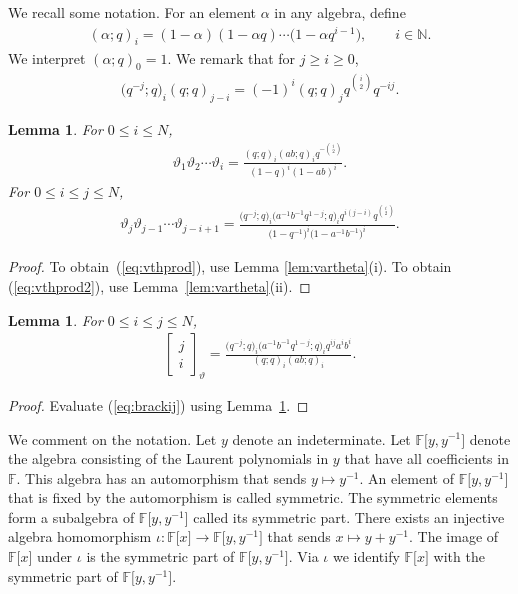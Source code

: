 \documentclass[pdftex]{sigma}
\numberwithin{equation}{section}
\newtheorem{Lemma}[Theorem]{Lemma}
\begin{document}
We recall some notation. For an element $\alpha$ in
any algebra, define
\begin{gather*}
(\alpha;q)_i = (1-\alpha) (1-\alpha q) \cdots \big(1-\alpha q^{i-1}\big),
\qquad i \in \mathbb N.
\end{gather*}
We interpret $(\alpha;q)_0=1$.
We remark that for $j\geq i\geq 0$,
\begin{gather}
\big(q^{-j};q\big)_i(q;q)_{j-i} =(-1)^i(q;q)_jq^{\binom{i}{2}}q^{-ij}.\label{eq:qint}
\end{gather}

\begin{Lemma}\label{lem:usefulvt}
For $0 \leq i \leq N$,
\begin{gather}
\vartheta_1 \vartheta_2 \cdots \vartheta_i =
\frac{(q;q)_i (ab;q)_i q^{-\binom{i}{2}}}{(1-q)^i(1-ab)^i}.
\label{eq:vthprod}
\end{gather}
For $0 \leq i\leq j\leq N$,
\begin{gather}
\vartheta_j \vartheta_{j-1} \cdots \vartheta_{j-i+1} =
\frac{
\big(q^{-j};q\big)_i \big(a^{-1}b^{-1}q^{1-j};q\big)_i q^{i(j-i)} q^{\binom{i}{2}}}
{\big(1-q^{-1}\big)^i\big(1-a^{-1}b^{-1}\big)^i}.\label{eq:vthprod2}
\end{gather}
\end{Lemma}
\begin{proof}
To obtain~(\ref{eq:vthprod}),
use Lemma \ref{lem:vartheta}(i).
To obtain (\ref{eq:vthprod2}), use Lemma~\ref{lem:vartheta}(ii).
\end{proof}

\begin{Lemma}\label{lem:ijN}
For $0 \leq i\leq j\leq N$,
\begin{gather*}
\left[\begin{matrix} j \\
i \end{matrix} \right]_\vartheta =
\frac{
\big(q^{-j};q\big)_i
\big(a^{-1} b^{-1} q^{1-j};q\big)_i
q^{ij}
a^ib^i}
{
(q;q)_i
(ab;q)_i
}.
\end{gather*}
\end{Lemma}
\begin{proof} Evaluate (\ref{eq:brackij}) using Lemma~\ref{lem:usefulvt}.
\end{proof}

We comment on the notation.
Let $y$ denote an indeterminate. Let
${\mathbb F}\big\lbrack y, y^{-1}\big\rbrack$
denote the algebra consisting of the Laurent polynomials in $y$ that have
all coefficients
in $\mathbb F$.
This algebra has an automorphism that sends $y\mapsto y^{-1}$.
An element of
${\mathbb F}\big\lbrack y, y^{-1}\big\rbrack$
that is fixed by the automorphism is called symmetric.
The symmetric elements form a subalgebra of
${\mathbb F}\big\lbrack y, y^{-1}\big\rbrack$
called its symmetric part.
There exists an injective algebra homomorphism
$\iota\colon {\mathbb F}\lbrack x \rbrack \to
{\mathbb F}\big\lbrack y, y^{-1}\big\rbrack$
that sends $x \mapsto y+y^{-1}$.
The image of
${\mathbb F}\lbrack x \rbrack$
under $\iota$ is the symmetric part of
${\mathbb F}\lbrack y, y^{-1}\rbrack$.
Via $\iota$ we
identify
${\mathbb F}\lbrack x \rbrack$
 with the symmetric part of
${\mathbb F}\lbrack y, y^{-1}\rbrack$.
\end{document}
